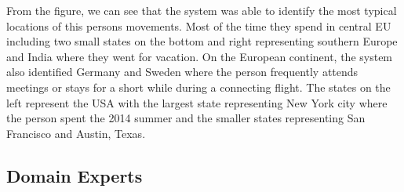 From the figure, we can see that the system was able to identify the most typical locations of this persons
movements. Most of the time they spend in central EU including two small states on the bottom and right
representing southern Europe and India where they went for vacation. On the European continent, the system
also identified Germany and Sweden where the person frequently attends meetings or stays for a short while
during a connecting flight. The states on the left represent the USA with the largest state representing New
York city where the person spent the 2014 summer and the smaller states representing San Francisco and Austin,
Texas.

\subsection{Domain Experts}